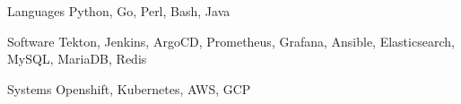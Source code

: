 
\begin{cvskills}

    \cvskill
    {Languages} %
    {Python, Go, Perl, Bash, Java} %

    \cvskill
    {Software} %
    {Tekton, Jenkins, ArgoCD, Prometheus, Grafana, Ansible, Elasticsearch, MySQL, MariaDB, Redis} %

    \cvskill
    {Systems} %
    {Openshift, Kubernetes, AWS, GCP} %


\end{cvskills}

